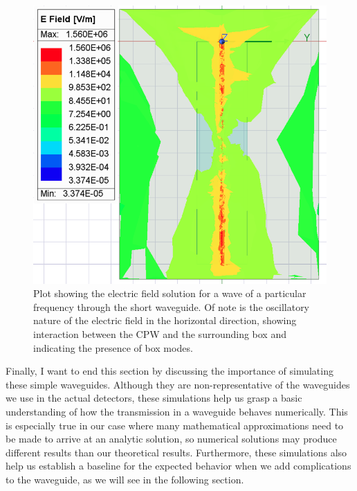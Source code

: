 \begin{figure}
	\centering
	\includegraphics[scale=0.3]{images/model/short-boxmode.png}
	\caption{Plot showing the electric field solution for a wave of a particular frequency through the short
	waveguide. Of note is the oscillatory nature of the electric field in the horizontal direction, showing
	interaction between the CPW and the surrounding box and indicating the presence of box modes.}
	\label{boxmode}
\end{figure}

Finally, I want to end this section by discussing the importance of simulating these simple waveguides.
Although they are non-representative of the waveguides we use in the actual detectors, these simulations help
us grasp a basic understanding of how the transmission in a waveguide behaves numerically. This is especially
true in our case where many mathematical approximations need to be made to arrive at an analytic solution, so
numerical solutions may produce different results than our theoretical results. Furthermore, these
simulations also help us establish a baseline for the expected behavior when we add complications to the
waveguide, as we will see in the following section. 
 

